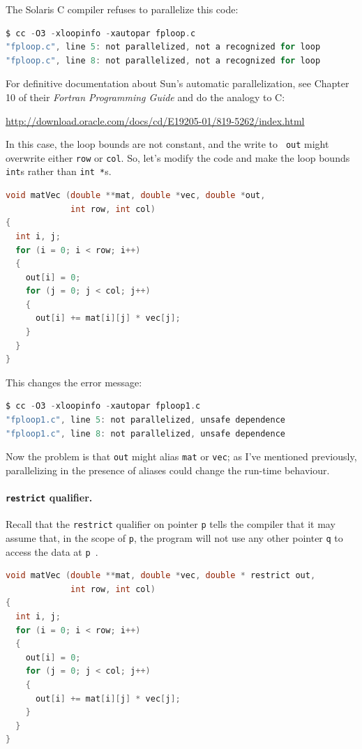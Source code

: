 \documentclass[a4paper]{report}
\begin{document}
The Solaris C compiler refuses to parallelize this code:
{\small 
\begin{lstlisting}[language=C]
$ cc -O3 -xloopinfo -xautopar fploop.c 
"fploop.c", line 5: not parallelized, not a recognized for loop
"fploop.c", line 8: not parallelized, not a recognized for loop
\end{lstlisting} 
}
For definitive documentation about Sun's automatic parallelization, see
Chapter 10 of their \emph{Fortran Programming Guide} and do the analogy to C:

\url{http://download.oracle.com/docs/cd/E19205-01/819-5262/index.html}

In this case, the loop bounds are not constant, and the write to {\tt
  out} might overwrite either {\tt row} or {\tt col}. So, let's modify
the code and make the loop bounds {\tt int}s rather than {\tt int *}s.
\begin{lstlisting}[language=C]
void matVec (double **mat, double *vec, double *out,
             int row, int col) 
{
  int i, j;
  for (i = 0; i < row; i++)
  {
    out[i] = 0;
    for (j = 0; j < col; j++)
    {
      out[i] += mat[i][j] * vec[j];
    }
  }
}
\end{lstlisting}
 This changes the error message:
\begin{lstlisting}[language=C]
$ cc -O3 -xloopinfo -xautopar fploop1.c 
"fploop1.c", line 5: not parallelized, unsafe dependence
"fploop1.c", line 8: not parallelized, unsafe dependence
\end{lstlisting} 

Now the problem is that {\tt out} might alias {\tt mat} or {\tt vec};
as I've mentioned previously, parallelizing
in the presence of aliases could change the run-time behaviour.

\paragraph{{\tt restrict} qualifier.} 
Recall that the {\tt restrict} qualifier on pointer {\tt p} tells
the compiler that it may assume that, in the scope of {\tt p},
the program will not use any other pointer {\tt q} to access the
data at {\tt *p}~\cite{cellperf}.
{
\begin{lstlisting}[language=C]
void matVec (double **mat, double *vec, double * restrict out,
             int row, int col) 
{
  int i, j;
  for (i = 0; i < row; i++)
  {
    out[i] = 0;
    for (j = 0; j < col; j++)
    {
      out[i] += mat[i][j] * vec[j];
    }
  }
}
\end{lstlisting}
}
\end{document}
